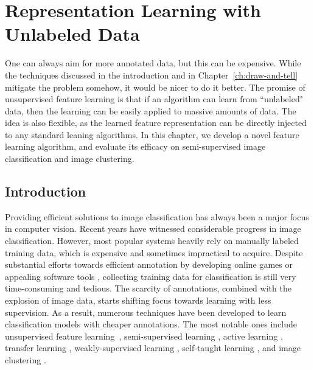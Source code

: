 \chapter{Representation Learning with Unlabeled Data}
\label{ch:ensemble}

One can always aim for more annotated data, but this can be expensive. While the techniques discussed in the introduction and in Chapter~\ref{ch:draw-and-tell} mitigate the problem somehow, it would be nicer to do it better.   
The promise of unsupervised feature learning is that if an algorithm can learn from ``unlabeled" data, then the learning can  be easily applied to massive amounts of data. The idea is also flexible, as the learned feature representation can be directly injected to any standard leaning algorithms.  In this chapter, we develop a novel feature learning algorithm, and evaluate its efficacy on semi-supervised image classification and image clustering.  

\section{Introduction}
\label{en:sec:intro}
Providing efficient solutions to image classification has always been a
major focus in computer vision. Recent years have witnessed
considerable progress in image classification. However, most popular
systems \citep{scene-15, Indoor, siftllc:cvpr10, 
Sun_2010, dai:TSC:11, Yang_2014_CVPR, deepnet:nips12} heavily rely
on manually labeled training data, which is expensive and sometimes
impractical to acquire. Despite substantial efforts towards
efficient annotation by developing online games \citep{game:purpose}
or appealing software tools \citep{label:me}, collecting training data
for classification is still very time-consuming and tedious. The scarcity
of annotations, combined with the explosion of image data, starts
shifting focus towards learning with less supervision. As a result,
numerous techniques have been developed to learn classification models
with cheaper annotations. The most notable ones include unsupervised feature 
learning~\citep{stl-10, cnnfet14, feature:context, feature:LSTM},  
semi-supervised learning \citep{Fergus09, Guillaumin:cvpr:10, dai:iccv13b}, 
active learning \citep{JainK:cvpr09, joshi2009multi},
transfer learning \citep{Transfer:CVPR:08, tl:survey},
weakly-supervised learning \citep{cvpr12:weak:video, metric:imitation}, self-taught learning
\citep{self-taught:icml07}, and image clustering
\citep{Sivic05b, dai:cvpr10}.



